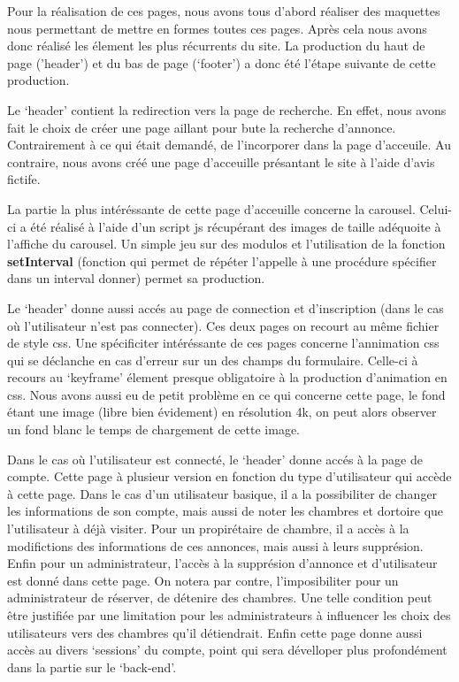 \documentclass[12pt]{article}
\begin{document}
    Pour la réalisation de ces pages, nous avons tous d'abord réaliser des 
    maquettes nous permettant de mettre en formes toutes ces pages. Après cela 
    nous avons donc réalisé les élement les plus récurrents du site. La 
    production du haut de page ('header') et du bas de page (`footer') a donc 
    été l'étape suivante de cette production. 

    Le `header' contient la redirection vers la page de recherche. En effet, 
    nous avons fait le choix de créer une page aillant pour bute la recherche 
    d'annonce. Contrairement à ce qui était demandé, de l'incorporer dans la page 
    d'acceuile. Au contraire, nous avons créé une page d'acceuille présantant 
    le site à l'aide d'avis fictife. 

    La partie la plus intéréssante de cette page d'acceuille concerne la 
    carousel. Celui-ci a été réalisé à l'aide d'un script js récupérant des 
    images de taille adéquoite à l'affiche du carousel. Un simple jeu sur des 
    modulos et l'utilisation de la fonction \textbf{setInterval} (fonction qui 
    permet de répéter l'appelle à une procédure spécifier dans un interval 
    donner) permet sa production. 

    Le `header' donne aussi accés au page de connection et d'inscription (dans 
    le cas où l'utilisateur n'est pas connecter). Ces deux pages on recourt au 
    même fichier de style css. Une spécificiter intéréssante de ces pages 
    concerne l'annimation css qui se déclanche en cas d'erreur sur un des champs 
    du formulaire. Celle-ci à recours au `keyframe' élement presque obligatoire 
    à la production d'animation en css. Nous avons aussi eu de petit problème en 
    ce qui concerne cette page, le fond étant une image (libre bien évidement) 
    en résolution 4k, on peut alors observer un fond blanc le temps de 
    chargement de cette image.
    
    Dans le cas où l'utilisateur est connecté, le `header' donne accés à la page 
    de compte. Cette page à plusieur version en fonction du type d'utilisateur 
    qui accède à cette page. Dans le cas d'un utilisateur basique, il a la 
    possibiliter de changer les informations de son compte, mais aussi de noter 
    les chambres et dortoire que l'utilisateur à déjà visiter. Pour un 
    propirétaire de chambre, il a accès à la modifictions des informations de 
    ces annonces, mais aussi à leurs supprésion. Enfin pour un administrateur,
    l'accès à la supprésion d'annonce et d'utilisateur est donné dans cette 
    page. On notera par contre, l'imposibiliter pour un administrateur de 
    réserver, de détenire des chambres. Une telle condition peut être justifiée
    par une limitation pour les administrateurs à influencer les choix des 
    utilisateurs vers des chambres qu'il détiendrait. Enfin cette page donne 
    aussi accès au divers `sessions' du compte, point qui sera dévelloper plus 
    profondément dans la partie sur le `back-end'.
\end{document}
